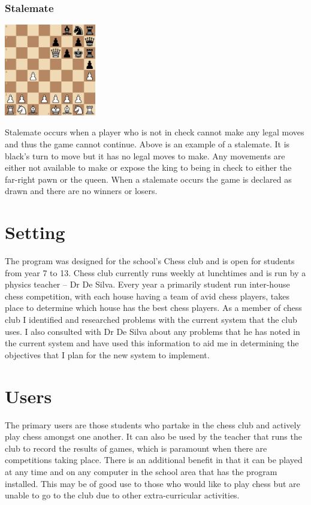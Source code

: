 \documentclass[]{report}
\begin{document}
\subsubsection{Stalemate}
\begin{center}
	\includegraphics[width=0.3\textwidth]{images/boards/stalemate_example}
\end{center}
Stalemate occurs when a player who is not in check cannot make any legal moves and thus the game cannot continue. Above is an example of a stalemate. It is black's turn to move but it has no legal moves to make. Any movements are either not available to make or expose the king to being in check to either the far-right pawn or the queen. When a stalemate occurs the game is declared as drawn and there are no winners or losers.
\section{Setting}
The program was designed for the school's Chess club and is open for students from year 7 to 13. Chess club currently runs weekly at lunchtimes and is run by a physics teacher – Dr De Silva. Every year a primarily student run inter-house chess competition, with each house having a team of avid chess players, takes place to determine which house has the best chess players. As a member of chess club I identified and researched problems with the current system that the club uses. I also consulted with Dr De Silva about any problems that he has noted in the current system and have used this information to aid me in determining the objectives that I plan for the new system to implement.
\section{Users}
The primary users are those students who partake in the chess club and actively play chess amongst one another. It can also be used by the teacher that runs the club to record the results of games, which is paramount when there are competitions taking place. There is an additional benefit in that it can be played at any time and on any computer in the school area that has the program installed. This may be of good use to those who would like to play chess but are unable to go to the club due to other extra-curricular activities.
\end{document}
